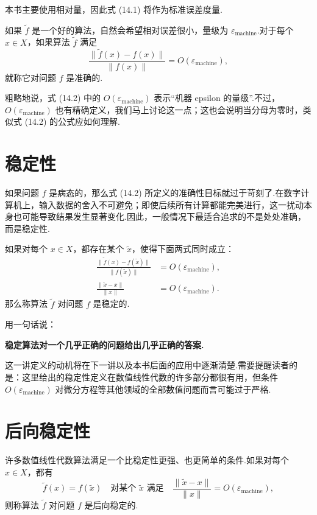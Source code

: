 \documentclass[UTF8,fontset=none,12pt]{ctexart}
\newcommand{\epsmach}{\varepsilon_{\mathrm{machine}}}
\theoremstyle{definition}
\begin{document}
本书主要使用相对量，因此式 (14.1) 将作为标准误差度量.

如果 $\widetilde f$ 是一个好的算法，自然会希望相对误差很小，量级为 $\epsmach$.对于每个 $x\in X$，如果算法 $\widetilde f$ 满足
\begin{equation}
    \frac{\|\widetilde f(x)-f(x)\|}{\|f(x)\|}
    =O(\epsmach),
    \tag{14.2}
\end{equation}
就称它对问题 $f$ 是准确的.

粗略地说，式 (14.2) 中的 $O(\epsmach)$ 表示“机器 epsilon 的量级”.不过，$O(\epsmach)$ 也有精确定义，我们马上讨论这一点；这也会说明当分母为零时，类似式 (14.2) 的公式应如何理解.

\section*{稳定性}

如果问题 $f$ 是病态的，那么式 (14.2) 所定义的准确性目标就过于苛刻了.在数字计算机上，输入数据的舍入不可避免；即使后续所有计算都能完美进行，这一扰动本身也可能导致结果发生显著变化.因此，一般情况下最适合追求的不是处处准确，而是稳定性.

如果对每个 $x\in X$，都存在某个 $\widetilde x$，使得下面两式同时成立：
\begin{align}
    \frac{\|\widetilde f(x)-f(\widetilde x)\|}
         {\|f(\widetilde x)\|}
    &=O(\epsmach),
    \tag{14.3}\\[0.5em]
    \frac{\|\widetilde x-x\|}{\|x\|}
    &=O(\epsmach).
    \tag{14.4}
\end{align}
那么称算法 $\widetilde f$ 对问题 $f$ 是稳定的.

用一句话说：
\begin{center}
\textbf{稳定算法对一个几乎正确的问题给出几乎正确的答案.}
\end{center}

这一讲定义的动机将在下一讲以及本书后面的应用中逐渐清楚.需要提醒读者的是：这里给出的稳定性定义在数值线性代数的许多部分都很有用，但条件 $O(\epsmach)$ 对微分方程等其他领域的全部数值问题而言可能过于严格.

\section*{后向稳定性}

许多数值线性代数算法满足一个比稳定性更强、也更简单的条件.如果对每个 $x\in X$，都有
\begin{equation}
    \widetilde f(x)=f(\widetilde x)
    \quad\text{对某个 }\widetilde x\text{ 满足}\quad
    \frac{\|\widetilde x-x\|}{\|x\|}
    =O(\epsmach),
    \tag{14.5}
\end{equation}
则称算法 $\widetilde f$ 对问题 $f$ 是后向稳定的.
\end{document}
